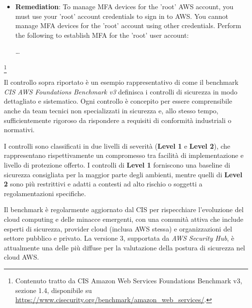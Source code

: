 \begin{mdframed}[backgroundcolor=gray!05, linecolor=gray!50]
\begin{itemize}
        From Command Line:

        \begin{enumerate}
            \item Run the following command:
\begin{lstlisting}[language=bash, xleftmargin=0pt, framexleftmargin=0pt]
aws iam get-account-summary | grep "AccountMFAEnabled"
aws iam get-account-summary | grep "AccountPasswordPresent"
\end{lstlisting}
            \item Ensure the \texttt{AccountMFAEnabled} property is set to 1 or the \texttt{AccountPasswordPresent} property is set to 0.
        \end{enumerate}
        \item \textbf{Remediation}: To manage MFA devices for the 'root' AWS account, you must use your 'root' account credentials to sign in to AWS. You cannot manage MFA devices for the 'root' account using other credentials. Perform the following to establish MFA for the 'root' user account:
        
        \dots

    \end{itemize}
    \end{mdframed}

    \footnote{Contenuto tratto da CIS Amazon Web Services Foundations Benchmark v3, sezione 1.4, disponibile su \url{https://www.cisecurity.org/benchmark/amazon_web_services/}.}

Il controllo sopra riportato è un esempio rappresentativo di come il benchmark \textit{CIS AWS Foundations Benchmark v3} definisca i controlli di sicurezza in modo dettagliato e sistematico. Ogni controllo è concepito per essere comprensibile anche da team tecnici non specializzati in sicurezza e, allo stesso tempo, sufficientemente rigoroso da rispondere a requisiti di conformità industriali o normativi.

I controlli sono classificati in due livelli di severità (\textbf{Level 1} e \textbf{Level 2}), che rappresentano rispettivamente un compromesso tra facilità di implementazione e livello di protezione offerto. I controlli di \textbf{Level 1} forniscono una baseline di sicurezza consigliata per la maggior parte degli ambienti, mentre quelli di \textbf{Level 2} sono più restrittivi e adatti a contesti ad alto rischio o soggetti a regolamentazioni specifiche.

Il benchmark è regolarmente aggiornato dal CIS per rispecchiare l'evoluzione del cloud computing e delle minacce emergenti, con una comunità attiva che include esperti di sicurezza, provider cloud (inclusa AWS stessa) e organizzazioni del settore pubblico e privato. La versione 3, supportata da \textit{AWS Security Hub}, è attualmente una delle più diffuse per la valutazione della postura di sicurezza nel cloud AWS.

